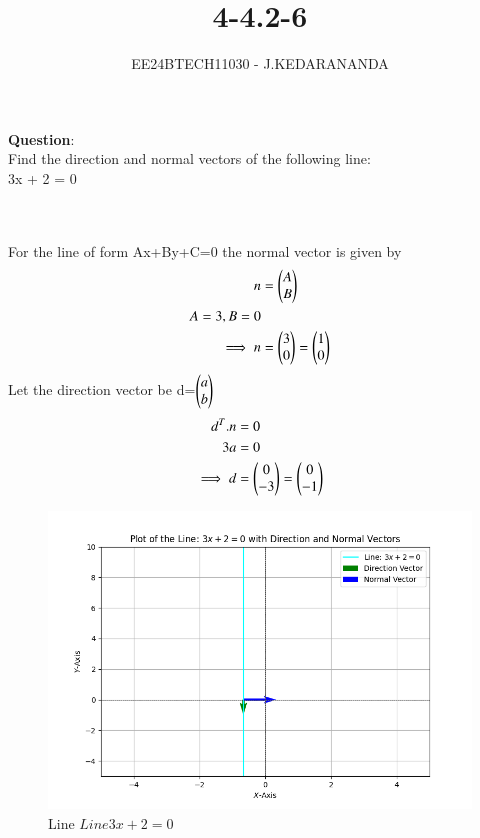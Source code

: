 \documentclass[journal]{IEEEtran}
\numberwithin{equation}{enumi}
\numberwithin{figure}{enumi}
\begin{document}

\title{4-4.2-6}
\author{EE24BTECH11030 - J.KEDARANANDA}
{\let\newpage\relax\maketitle}
\textbf{Question}:\\
Find the direction and normal vectors of the following line:\\
3x + 2 = 0
\\
\solution \\
\begin{table}[h!]
  \centering
  
  \caption{}
  \label{tabQuestion-4-4.2-6}
\end{table}\\
For the line of form Ax+By+C=0 the normal vector is given by
\begin{align}
    n&=\begin{pmatrix}A\\B\end{pmatrix}\\
    A=3,B=0\\
    \implies n&=\begin{pmatrix}3\\0\end{pmatrix} = \begin{pmatrix}1\\0\end{pmatrix}
\end{align}
Let the direction vector be d=$\begin{pmatrix}a\\b\end{pmatrix}$
\begin{align}
    d^T.n&=0\\
    3a&=0\\
    \implies d&=\begin{pmatrix}0\\-3\end{pmatrix} = \begin{pmatrix}0\\-1\end{pmatrix}
\end{align}
\begin{figure}[h!]
    \centering
    \includegraphics[width=\linewidth]{figs/fig1.png}
    \caption{ Line $Line 3x + 2 = 0$}
\end{figure}
\end{document}

